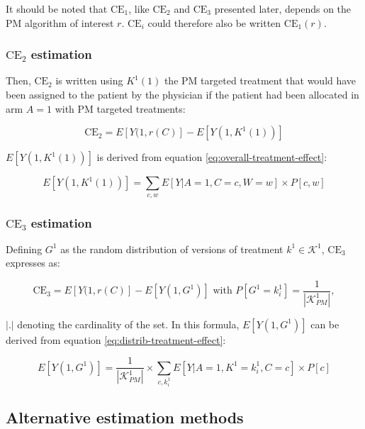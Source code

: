 \documentclass[a4paper,12pt,twoside,onecolumn,openright,final,oldfontcommands]{memoir}
\begin{document}
It should be noted that \(\text{CE}_1\), like \(\text{CE}_2\) and
\(\text{CE}_3\) presented later, depends on the PM algorithm of interest
\(r\). \(\text{CE}_i\) could therefore also be written
\(\text{CE}_1(r)\).

\subsubsection{\texorpdfstring{\(\text{CE}_2\)
estimation}{\textbackslash{}text\{CE\}\_2 estimation}}\label{textce_2-estimation}

Then, \(\text{CE}_2\) is written using \(K^1(1)\) the PM targeted
treatment that would have been assigned to the patient by the physician
if the patient had been allocated in arm \(A=1\) with PM targeted
treatments:

\begin{equation}
\text{CE}_2 = E[Y(1, r(C)] - E[Y(1, K^1(1))]
\label{eq:CE2}
\end{equation}

\(E[Y(1, K^1(1))]\) is derived from equation
\eqref{eq:overall-treatment-effect}:

\[E[Y(1, K^1(1))] = \sum_{c,w} E[Y | A=1, C=c, W=w] \times P[c,w]\]

\subsubsection{\texorpdfstring{\(\text{CE}_3\)
estimation}{\textbackslash{}text\{CE\}\_3 estimation}}\label{textce_3-estimation}

Defining \(G^1\) as the random distribution of versions of treatment
\(k^1 \in \mathcal{K}^{1}\), \(\text{CE}_3\) expresses as:

\begin{equation}
\text{CE}_3 = E[Y(1, r(C)] - E[Y(1, G^1)] \text{ with } P[G^1=k^1_i]=\dfrac{1}{|\mathcal{K}^1_{PM}|},
\label{eq:CE3}
\end{equation}

\(|.|\) denoting the cardinality of the set. In this formula,
\(E[Y(1, G^1)]\) can be derived from equation
\eqref{eq:distrib-treatment-effect}:

\[E[Y(1, G^1)] = \dfrac{1}{|\mathcal{K}^1_{PM}|} \times \sum_{c,k^1_i} E[Y | A=1, K^1=k^1_i, C=c] \times P[c]\]

\subsection{Alternative estimation methods}\label{PM-others}
\end{document}
